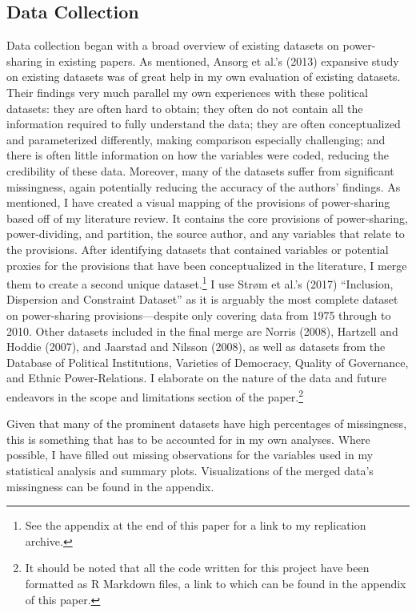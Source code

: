 \documentclass[12pt]{article}
\begin{document}
\subsection{Data Collection}
Data collection began with a broad overview of existing datasets on power-sharing in existing papers. As mentioned, Ansorg et al.’s (2013) expansive study on existing datasets was of great help in my own evaluation of existing datasets. Their findings very much parallel my own experiences with these political datasets: they are often hard to obtain; they often do not contain all the information required to fully understand the data; they are often conceptualized and parameterized differently, making comparison especially challenging; and there is often little information on how the variables were coded, reducing the credibility of these data. Moreover, many of the datasets suffer from significant missingness, again potentially reducing the accuracy of the authors’ findings. As mentioned, I have created a visual mapping of the provisions of power-sharing based off of my literature review. It contains the core provisions of power-sharing, power-dividing, and partition, the source author, and any variables that relate to the provisions. After identifying datasets that contained variables or potential proxies for the provisions that have been conceptualized in the literature, I merge them to create a second unique dataset.\footnote{See the appendix at the end of this paper for a link to my replication archive.} I use Strøm et al.’s (2017) ``Inclusion, Dispersion and Constraint Dataset'' as it is arguably the most complete dataset on power-sharing provisions---despite only covering data from 1975 through to 2010. Other datasets included in the final merge are Norris (2008), Hartzell and Hoddie (2007), and Jaarstad and Nilsson (2008), as well as datasets from the Database of Political Institutions, Varieties of Democracy, Quality of Governance, and Ethnic Power-Relations. I elaborate on the nature of the data and future endeavors in the scope and limitations section of the paper.\footnote{It should be noted that all the code written for this project have been formatted as R Markdown files, a link to which can be found in the appendix of this paper.}

Given that many of the prominent datasets have high percentages of missingness, this is something that has to be accounted for in my own analyses. Where possible, I have filled out missing observations for the variables used in my statistical analysis and summary plots. Visualizations of the merged data’s missingness can be found in the appendix. 
\end{document}
